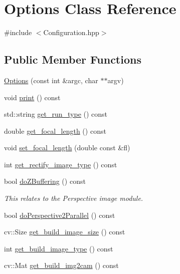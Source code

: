 \hypertarget{classOptions}{\section{\-Options \-Class \-Reference}
\label{classOptions}
}


{\ttfamily \#include $<$\-Configuration.\-hpp$>$}

\subsection*{\-Public \-Member \-Functions}
\begin{DoxyCompactItemize}
\item 
\hyperlink{classOptions_a70562558b9e6dc8b705bdcd4a038d527}{\-Options} (const int \&argc, char $\ast$$\ast$argv)
\item 
void \hyperlink{classOptions_a3a3720166ef57a1d4199331a86c89a35}{print} () const 
\item 
std\-::string \hyperlink{classOptions_a87e242b615b343985754952c351ceac1}{get\-\_\-run\-\_\-type} () const 
\item 
double \hyperlink{classOptions_aa665c69441b616a3f261783050131c17}{get\-\_\-focal\-\_\-length} () const 
\item 
void \hyperlink{classOptions_aae3707f15f322ac9c0a6ed3f30cf1b04}{set\-\_\-focal\-\_\-length} (double const \&fl)
\item 
int \hyperlink{classOptions_ad14d2104c0b7f8612e4ea2936b173f27}{get\-\_\-rectify\-\_\-image\-\_\-type} () const 
\item 
bool \hyperlink{classOptions_afd99d48205329dfa5182405927f6d65f}{do\-Z\-Buffering} () const 
\begin{DoxyCompactList}\small\item\em \-This relates to the \-Perspective image module. \end{DoxyCompactList}\item 
bool \hyperlink{classOptions_a4bb87e1e654417d04ec5041d1a10cd10}{do\-Perspective2\-Parallel} () const 
\item 
cv\-::\-Size \hyperlink{classOptions_a0110ff824f74adc1755090be2bcbc99b}{get\-\_\-build\-\_\-image\-\_\-size} () const 
\item 
int \hyperlink{classOptions_a90dba7e5af77378030294944e496e13e}{get\-\_\-build\-\_\-image\-\_\-type} () const 
\item 
cv\-::\-Mat \hyperlink{classOptions_a862485b7bcdd70e055807b3f1c5e003c}{get\-\_\-build\-\_\-img2cam} () const 
\item 
$$
\end{DoxyCompactItemize}
